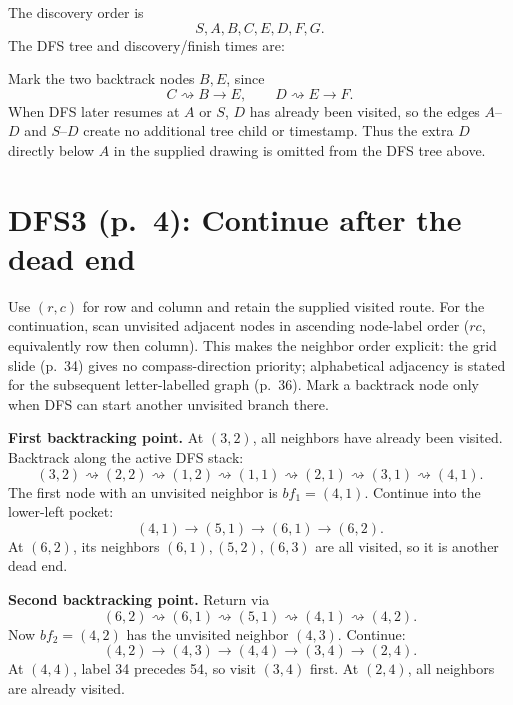 \documentclass[11pt,a4paper]{article}
\newcommand{\question}[2]{\section*{#1: #2}}
\begin{document}
The discovery order is
\[
\boxed{S,A,B,C,E,D,F,G}.
\]
The DFS tree and discovery/finish times are:
\begin{center}\end{center}
Mark the two backtrack nodes $\boxed{B,E}$, since
\[
C\rightsquigarrow B\to E,\qquad D\rightsquigarrow E\to F.
\]
When DFS later resumes at $A$ or $S$, $D$ has already been visited, so the edges $A$--$D$ and $S$--$D$ create no additional tree child or timestamp. Thus the extra $D$ directly below $A$ in the supplied drawing is omitted from the DFS tree above.

\newpage
\question{DFS3 (p.\ 4)}{Continue after the dead end}
Use $(r,c)$ for row and column and retain the supplied visited route. For the continuation, scan unvisited adjacent nodes in ascending node-label order ($rc$, equivalently row then column). This makes the neighbor order explicit: the grid slide (p.\ 34) gives no compass-direction priority; alphabetical adjacency is stated for the subsequent letter-labelled graph (p.\ 36). Mark a backtrack node only when DFS can start another unvisited branch there.

\textbf{First backtracking point.} At $(3,2)$, all neighbors have already been visited. Backtrack along the active DFS stack:
\[
(3,2)\rightsquigarrow(2,2)\rightsquigarrow(1,2)\rightsquigarrow(1,1)
\rightsquigarrow(2,1)\rightsquigarrow(3,1)\rightsquigarrow(4,1).
\]
The first node with an unvisited neighbor is $\boxed{bf_1=(4,1)}$. Continue into the lower-left pocket:
\[
(4,1)\to(5,1)\to(6,1)\to(6,2).
\]
At $(6,2)$, its neighbors $(6,1),(5,2),(6,3)$ are all visited, so it is another dead end.

\textbf{Second backtracking point.} Return via
\[
(6,2)\rightsquigarrow(6,1)\rightsquigarrow(5,1)\rightsquigarrow(4,1)\rightsquigarrow(4,2).
\]
Now $\boxed{bf_2=(4,2)}$ has the unvisited neighbor $(4,3)$. Continue:
\[
(4,2)\to(4,3)\to(4,4)\to(3,4)\to(2,4).
\]
At $(4,4)$, label 34 precedes 54, so visit $(3,4)$ first. At $(2,4)$, all neighbors are already visited.
\end{document}
